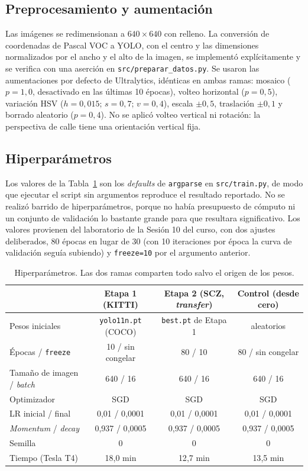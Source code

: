 \documentclass[10pt,a4paper]{article}
\begin{document}
\subsection{Preprocesamiento y aumentación}
Las imágenes se redimensionan a $640\times640$ con relleno. La conversión de coordenadas
de Pascal VOC a YOLO, con el centro y las dimensiones normalizados por el ancho y el alto
de la imagen, se implementó explícitamente y se verifica con una aserción en
\texttt{src/preparar\_datos.py}. Se usaron las aumentaciones por defecto de Ultralytics,
idénticas en ambas ramas: mosaico ($p=1{,}0$, desactivado en las últimas 10 épocas),
volteo horizontal ($p=0{,}5$), variación HSV ($h=0{,}015$; $s=0{,}7$; $v=0{,}4$), escala
$\pm0{,}5$, traslación $\pm0{,}1$ y borrado aleatorio ($p=0{,}4$). No se aplicó volteo
vertical ni rotación: la perspectiva de calle tiene una orientación vertical fija.

\subsection{Hiperparámetros}
Los valores de la Tabla~\ref{tab:hp} son los \emph{defaults} de \texttt{argparse} en
\texttt{src/train.py}, de modo que ejecutar el script sin argumentos reproduce el
resultado reportado. No se realizó barrido de hiperparámetros, porque no había presupuesto
de cómputo ni un conjunto de validación lo bastante grande para que resultara
significativo. Los valores provienen del laboratorio de la Sesión 10 del curso, con
dos ajustes deliberados, 80 épocas en lugar de 30 (con 10 iteraciones por época la curva
de validación seguía subiendo) y \texttt{freeze=10} por el argumento anterior.

\begin{table}[H]
\centering\footnotesize
\caption{Hiperparámetros. Las dos ramas comparten todo salvo el origen de los pesos.}
\label{tab:hp}
\begin{tabular}{@{}lccc@{}}
\toprule
& \textbf{Etapa 1 (KITTI)} & \textbf{Etapa 2 (SCZ, \emph{transfer})} & \textbf{Control (desde cero)}\\
\midrule
Pesos iniciales & \texttt{yolo11n.pt} (COCO) & \texttt{best.pt} de Etapa 1 & aleatorios\\
Épocas / \texttt{freeze} & 10 / sin congelar & 80 / 10 & 80 / sin congelar\\
Tamaño de imagen / \emph{batch} & 640 / 16 & 640 / 16 & 640 / 16\\
Optimizador & SGD & SGD & SGD\\
LR inicial / final & 0{,}01 / 0{,}0001 & 0{,}01 / 0{,}0001 & 0{,}01 / 0{,}0001\\
\emph{Momentum} / \emph{decay} & 0{,}937 / 0{,}0005 & 0{,}937 / 0{,}0005 & 0{,}937 / 0{,}0005\\
Semilla & 0 & 0 & 0\\
Tiempo (Tesla T4) & 18{,}0 min & 12{,}7 min & 13{,}5 min\\
\bottomrule
\end{tabular}
\end{table}
\end{document}
